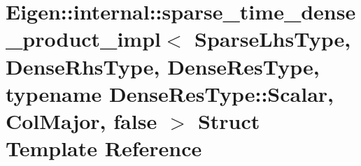 \hypertarget{struct_eigen_1_1internal_1_1sparse__time__dense__product__impl_3_01_sparse_lhs_type_00_01_dense_67299fc86a44049a87b7e209695d23ff}{}\section{Eigen\+:\+:internal\+:\+:sparse\+\_\+time\+\_\+dense\+\_\+product\+\_\+impl$<$ Sparse\+Lhs\+Type, Dense\+Rhs\+Type, Dense\+Res\+Type, typename Dense\+Res\+Type\+:\+:Scalar, Col\+Major, false $>$ Struct Template Reference}
\label{struct_eigen_1_1internal_1_1sparse__time__dense__product__impl_3_01_sparse_lhs_type_00_01_dense_67299fc86a44049a87b7e209695d23ff}
